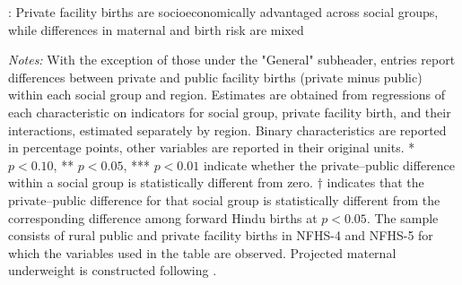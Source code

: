 \documentclass[12pt]{article}
\begin{document}
\begin{landscape}

\renewcommand{\arraystretch}{1.2}
\setlength{\tabcolsep}{9pt}

\begin{table}[H]
    \centering
    \caption{
        : Private facility births are socioeconomically advantaged across social groups, while differences in maternal and birth risk are mixed
    }
    \label{tab:private_public_characteristics}

    \vspace{0.4em}

    \begin{threeparttable}

        \footnotesize

        \begin{adjustbox}{max width=\linewidth}
        \scriptsize
            
        \end{adjustbox}

    \end{threeparttable}

    \vspace{0.5em}

    \begin{minipage}{0.92\linewidth}
        \scriptsize
        \textit{Notes:}
        With the exception of those under the "General" subheader, entries report differences between private and public facility births (private minus public) within each social group and region. Estimates are obtained from regressions of each characteristic on indicators for social group, private facility birth, and their interactions, estimated separately by region. 
        Binary characteristics are reported in percentage points, other variables are reported in their original units. 
        * $p<0.10$, ** $p<0.05$, *** $p<0.01$ indicate whether the private--public difference within a social group is statistically different from zero. 
        $\dagger$ indicates that the private--public difference for that social group is statistically different from the corresponding difference among forward Hindu births at $p<0.05$. The sample consists of rural public and private facility births in NFHS-4 and NFHS-5 for which the variables used in the table are observed. Projected maternal underweight is constructed following \citet{coffey2025excess}.
    \end{minipage}

\end{table}

\setlength{\tabcolsep}{6pt}
\renewcommand{\arraystretch}{1}

\end{landscape}
\end{document}
